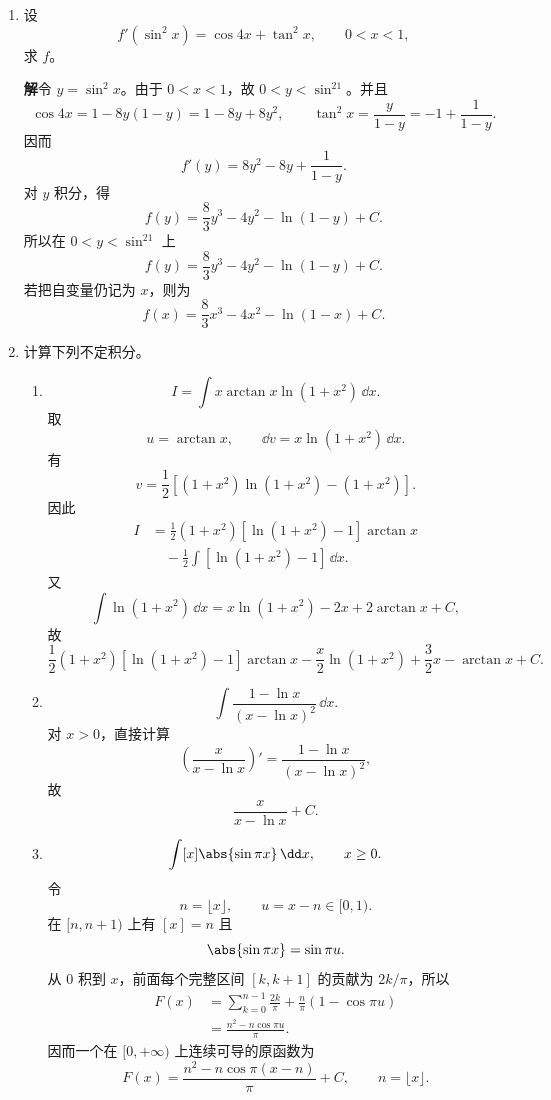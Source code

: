 \begin{enumerate}
  \item 设
  \[
    f'(\sin^2x)=\cos4x+\tan^2x,
    \qquad 0<x<1,
  \]
  求 $f$。

  \textbf{解}\quad 令 $y=\sin^2x$。由于 $0<x<1$，故 $0<y<\sin^21$。并且
  \[
    \cos4x=1-8y(1-y)=1-8y+8y^2,
    \qquad
    \tan^2x=\frac{y}{1-y}=-1+\frac1{1-y}.
  \]
  因而
  \[
    f'(y)=8y^2-8y+\frac1{1-y}.
  \]
  对 $y$ 积分，得
  \[
    f(y)=\frac83y^3-4y^2-\ln(1-y)+C.
  \]
  所以在 $0<y<\sin^21$ 上
  \[
    \boxed{f(y)=\frac83y^3-4y^2-\ln(1-y)+C}.
  \]
  若把自变量仍记为 $x$，则为
  \[
    \boxed{f(x)=\frac83x^3-4x^2-\ln(1-x)+C}.
  \]

  \item 计算下列不定积分。
  \begin{enumerate}[label=(\arabic*)]
    \item
    \[
      I=\int x\arctan x\ln(1+x^2)\,\dd x.
    \]
    取
    \[
      u=\arctan x,
      \qquad
      \dd v=x\ln(1+x^2)\,\dd x.
    \]
    有
    \[
      v=\frac12\left[(1+x^2)\ln(1+x^2)-(1+x^2)\right].
    \]
    因此
    \begin{align*}
      I
      &=\frac12(1+x^2)[\ln(1+x^2)-1]\arctan x\\
      &\quad-\frac12\int[\ln(1+x^2)-1]\,\dd x.
    \end{align*}
    又
    \[
      \int\ln(1+x^2)\,\dd x
      =x\ln(1+x^2)-2x+2\arctan x+C,
    \]
    故
    \[
      \boxed{
      \frac12(1+x^2)[\ln(1+x^2)-1]\arctan x
      -\frac x2\ln(1+x^2)+\frac32x-\arctan x+C}.
    \]

    \item
    \[
      \int\frac{1-\ln x}{(x-\ln x)^2}\,\dd x.
    \]
    对 $x>0$，直接计算
    \[
      \left(\frac{x}{x-\ln x}\right)'
      =\frac{1-\ln x}{(x-\ln x)^2},
    \]
    故
    \[
      \boxed{\frac{x}{x-\ln x}+C}.
    \]

    \item
    \[
      \int [x]\abs{\sin\pi x}\,\dd x,
      \qquad x\ge0.
    \]
    令
    \[
      n=\lfloor x\rfloor,
      \qquad
      u=x-n\in[0,1).
    \]
    在 $[n,n+1)$ 上有 $[x]=n$ 且
    \[
      \abs{\sin\pi x}=\sin\pi u.
    \]
    从 $0$ 积到 $x$，前面每个完整区间 $[k,k+1]$ 的贡献为 $2k/\pi$，所以
    \begin{align*}
      F(x)
      &=\sum_{k=0}^{n-1}\frac{2k}{\pi}
        +\frac{n}{\pi}(1-\cos\pi u)\\
      &=\frac{n^2-n\cos\pi u}{\pi}.
    \end{align*}
    因而一个在 $[0,+\infty)$ 上连续可导的原函数为
    \[
      \boxed{
      F(x)=\frac{n^2-n\cos\pi(x-n)}{\pi}+C,
      \qquad n=\lfloor x\rfloor}.
    \]


\end{enumerate}
\end{enumerate}
